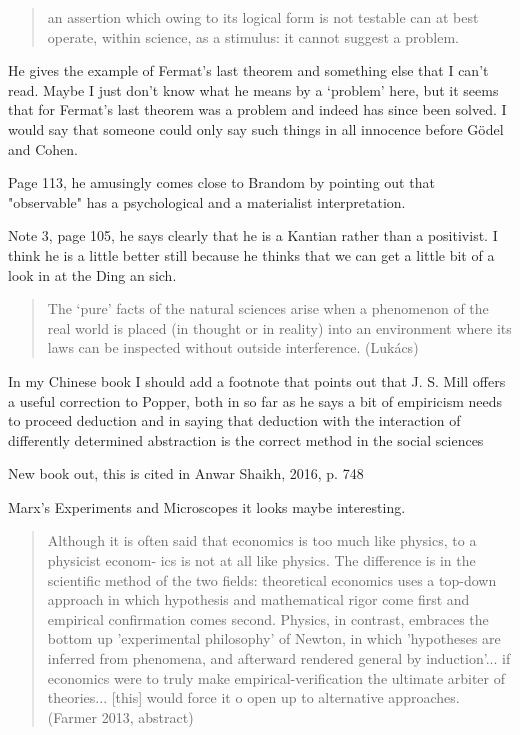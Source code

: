 \begin{quote}
    an assertion which owing to its logical form is not testable can at best operate, within science, as a stimulus: it cannot suggest a problem. \citep[99]{Popper1959logic}
\end{quote}

He gives the example of Fermat's last theorem and something else that I can't read. Maybe I just don't know what he means by a `problem' here, but it seems that for Fermat's last theorem was a problem and indeed has since been solved. I would say that someone could only say such things in all innocence before Gödel and Cohen.

Page 113, he amusingly comes close to Brandom by pointing out that "observable" has a psychological and a materialist interpretation.

Note 3, page 105, he says clearly that he is a Kantian rather than a positivist. I think he is a little better still because he thinks that we can get a little bit of a look in at the Ding an sich. 


\begin{quote}
The `pure' facts of the natural sciences arise when a phenomenon of the real world is placed (in thought or in reality) into an environment where its laws can be inspected without outside interference. (Lukács)
\end{quote}

In my Chinese book I should add a footnote that points out that J. S. Mill offers a useful correction to Popper, both in so far as he says a bit of empiricism needs to proceed deduction and in saying that deduction with the interaction of differently determined abstraction is the correct method in the social sciences 


New book out, this is cited in Anwar Shaikh, 2016, p. 748

Marx's Experiments and Microscopes
it looks maybe interesting. 
\begin{quote}
    Although it is often said that economics is too much like physics, to a physicist econom- ics is not at all like physics. The difference is in the scientific method of the two fields: theoretical economics uses a top-down approach in which hypothesis and mathematical rigor come first and empirical confirmation comes second. Physics, in contrast, embraces the bottom up 'experimental philosophy' of Newton, in which 'hypotheses are inferred from phenomena, and afterward rendered general by induction'... if economics were to truly make empirical-verification the ultimate arbiter of theories... [this] would force it o open up to alternative approaches. (Farmer 2013, abstract) 
\end{quote}




